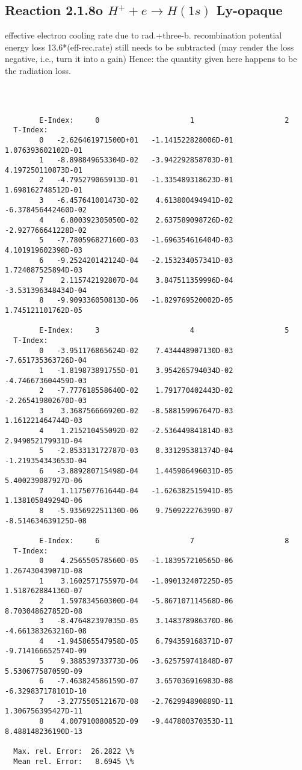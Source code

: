 \documentclass[12pt,dvipdfmx]{article}
\begin{document}
\subsection{
  Reaction 2.1.8o $H^+ + e \rightarrow H(1s) $ Ly-opaque
}

   effective electron cooling rate due to rad.+three-b. recombination
   potential energy loss 13.6*(eff-rec.rate) still needs to be
   subtracted (may render the loss negative, i.e., turn it into a gain)
   Hence: the quantity given here happens to be the radiation loss.

\begin{small}\begin{verbatim}



        E-Index:     0                     1                     2
  T-Index:
        0   -2.626461971500D+01   -1.141522828006D-01    1.076393602102D-01
        1   -8.898849653304D-02   -3.942292858703D-01    4.197250110873D-01
        2   -4.795279065913D-01   -1.335489318623D-01    1.698162748512D-01
        3   -6.457641001473D-02    4.613800494941D-02   -6.378456442460D-02
        4    6.800392305050D-02    2.637589098726D-02   -2.927766641228D-02
        5   -7.780596827160D-03   -1.696354616404D-03    4.101919602398D-03
        6   -9.252420142124D-04   -2.153234057341D-03    1.724087525894D-03
        7    2.115742192807D-04    3.847511359996D-04   -3.531396348434D-04
        8   -9.909336050813D-06   -1.829769520002D-05    1.745121101762D-05

        E-Index:     3                     4                     5
  T-Index:
        0   -3.951176865624D-02    7.434448907130D-03   -7.651735363726D-04
        1   -1.819873891755D-01    3.954265794034D-02   -4.746673604459D-03
        2   -7.777618558640D-02    1.791770402443D-02   -2.265419802670D-03
        3    3.368756666920D-02   -8.588159967647D-03    1.161221464744D-03
        4    1.215210455092D-02   -2.536449841814D-03    2.949052179931D-04
        5   -2.853313172787D-03    8.331295381374D-04   -1.219354343653D-04
        6   -3.889280715498D-04    1.445906496031D-05    5.400239087927D-06
        7    1.117507761644D-04   -1.626382515941D-05    1.138105849294D-06
        8   -5.935692251130D-06    9.750922276399D-07   -8.514634639125D-08

        E-Index:     6                     7                     8
  T-Index:
        0    4.256550578560D-05   -1.183957210565D-06    1.267430439071D-08
        1    3.160257175597D-04   -1.090132407225D-05    1.518762884136D-07
        2    1.597834560300D-04   -5.867107114568D-06    8.703048627852D-08
        3   -8.476482397035D-05    3.148378986370D-06   -4.661383263216D-08
        4   -1.945865547958D-05    6.794359168371D-07   -9.714166652574D-09
        5    9.388539733773D-06   -3.625759741848D-07    5.530677587059D-09
        6   -7.463824586159D-07    3.657036916983D-08   -6.329837178101D-10
        7   -3.277550512167D-08   -2.762994890889D-11    1.306756395427D-11
        8    4.007910080852D-09   -9.447800370353D-11    8.488148236190D-13

  Max. rel. Error:  26.2822 \%
  Mean rel. Error:   8.6945 \%

\end{verbatim}\end{small}
\end{document}
